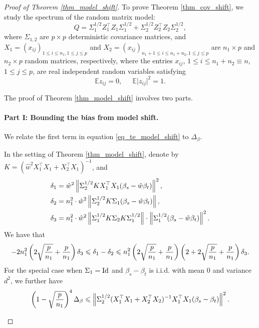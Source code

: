 \begin{proof}[Proof of Theorem \ref{thm_model_shift}]
\noindent{}
To prove Theorem \ref{thm_cov_shift}, we study the spectrum of the random matrix model:
$$Q= \Sigma_1^{1/2}  Z_1^{\top} Z_1 \Sigma_1^{1/2}  + \Sigma_2^{1/2}  Z_2^{\top} Z_2 \Sigma_2^{1/2} ,$$
where $\Sigma_{1,2}$ are $p\times p$ deterministic covariance matrices, and $X_1=(x_{ij})_{1\le i \le n_1, 1\le j \le p}$ and $X_2=(x_{ij})_{n_1+1\le i \le n_1+n_2, 1\le j \le p}$ are $n_1\times p$ and $n_2 \times p$ random matrices, respectively, where the entries $x_{ij}$, $1 \leq i \leq n_1+n_2\equiv n$, $1 \leq j \leq p$, are real independent random variables satisfying
\begin{equation}\label{eq_12moment} %
\mathbb{E} z_{ij} =0, \ \quad \ \mathbb{E} \vert z_{ij} \vert^2  = 1.
\end{equation}

The proof of Theorem \ref{thm_model_shift} involves two parts.

\paragraph{Part I: Bounding the bias from model shift.}
We relate the first term in equation \eqref{eq_te_model_shift} to $\Delta_{\beta}$.
\begin{proposition}\label{prop_model_shift}
	In the setting of Theorem \ref{thm_model_shift},
	denote by $K = (\hat{w}^2X_1^{\top}X_1 + X_2^{\top}X_1)^{-1}$, and
	\begin{align*}
		\delta_1 &= \hat{w}^2 \left\| \Sigma_2^{1/2} K X_1^{\top}X_1(\beta_s - \hat{w}\beta_t) \right\|^2, \\
		\delta_2 &= n_1^2\cdot \hat{w}^2 \left\| \Sigma_2^{1/2}K\Sigma_1(\beta_s - \hat{w}\beta_t) \right\|, \\
		\delta_3 &= n_1^2\cdot \hat{w}^2 \left\| \Sigma_1^{1/2} K \Sigma_2 K \Sigma_1^{1/2} \right\| \cdot \left\| \Sigma_1^{1/2} (\beta_s - \hat{w}\beta_t) \right\|^2.
	\end{align*}
	We have that
	\begin{align*}
		-2n_1^2\left({{2\sqrt{\frac{p}{n_1}}} + {\frac{p}{n_1}}}\right) \delta_3
		\leqslant  \delta_1 - \delta_2
		\leqslant n_1^2\left({2\sqrt{\frac{p}{n_1}} + \frac{p}{n_1}}\right)\left({2 + 2\sqrt{\frac{p}{n_1}} + \frac{p}{n_1}}\right)\delta_3.
	\end{align*}
	For the special case when $\Sigma_1 = \operatorname{Id}$ and $\beta_s - \beta_t$ is i.i.d. with mean $0$ and variance $d^2$, we further have
	\begin{align*}
		\left({1 - \sqrt{\frac{p}{n_1}}}\right)^4 \Delta_{\beta}
		\leqslant \left\| \Sigma_2^{1/2} (X_1^{\top}X_1 + X_2^{\top}X_2)^{-1}X_1^{\top}X_1(\beta_s - \beta_t) \right\|^2.
	\end{align*}
\end{proposition}


\end{proof}

